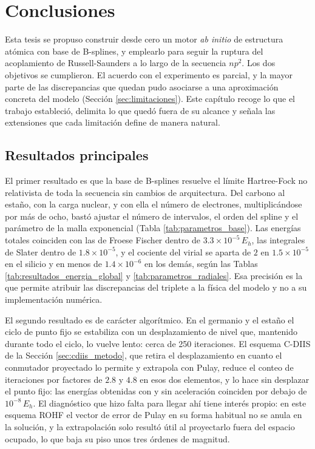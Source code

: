\chapter{Conclusiones}
\label{ch:conclusiones}

Esta tesis se propuso construir desde cero un motor \textit{ab initio} de estructura atómica con base de B-splines, y emplearlo para seguir la ruptura del acoplamiento de Russell-Saunders a lo largo de la secuencia $np^2$. Los dos objetivos se cumplieron. El acuerdo con el experimento es parcial, y la mayor parte de las discrepancias que quedan pudo asociarse a una aproximación concreta del modelo (Sección \ref{sec:limitaciones}). Este capítulo recoge lo que el trabajo estableció, delimita lo que quedó fuera de su alcance y señala las extensiones que cada limitación define de manera natural.

\section{Resultados principales}

El primer resultado es que la base de B-splines resuelve el límite Hartree-Fock no relativista de toda la secuencia sin cambios de arquitectura. Del carbono al estaño, con la carga nuclear, y con ella el número de electrones, multiplicándose por más de ocho, bastó ajustar el número de intervalos, el orden del spline y el parámetro de la malla exponencial (Tabla \ref{tab:parametros_base}). Las energías totales coinciden con las de Froese Fischer dentro de $3.3\times10^{-5}\,E_h$, las integrales de Slater dentro de $1.8\times10^{-5}$, y el cociente del virial se aparta de $2$ en $1.5\times10^{-5}$ en el silicio y en menos de $1.4\times10^{-6}$ en los demás, según las Tablas \ref{tab:resultados_energia_global} y \ref{tab:parametros_radiales}. Esa precisión es la que permite atribuir las discrepancias del triplete a la física del modelo y no a su implementación numérica.

El segundo resultado es de carácter algorítmico. En el germanio y el estaño el ciclo de punto fijo se estabiliza con un desplazamiento de nivel que, mantenido durante todo el ciclo, lo vuelve lento: cerca de 250 iteraciones. El esquema C-DIIS de la Sección \ref{sec:cdiis_metodo}, que retira el desplazamiento en cuanto el conmutador proyectado lo permite y extrapola con Pulay, reduce el conteo de iteraciones por factores de $2.8$ y $4.8$ en esos dos elementos, y lo hace sin desplazar el punto fijo: las energías obtenidas con y sin aceleración coinciden por debajo de $10^{-8}\,E_h$. El diagnóstico que hizo falta para llegar ahí tiene interés propio: en este esquema ROHF el vector de error de Pulay en su forma habitual no se anula en la solución, y la extrapolación solo resultó útil al proyectarlo fuera del espacio ocupado, lo que baja su piso unos tres órdenes de magnitud.

